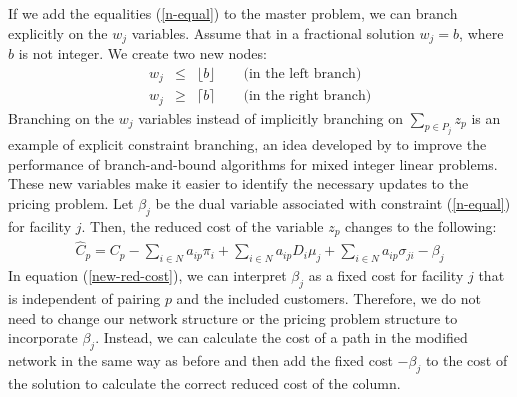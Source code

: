 \begin {itemize}
  If we add the equalities (\ref{n-equal}) to the master problem, we can branch explicitly on
  the $w_j$ variables. Assume that in a fractional solution $w_j = b$, where $b$ is not integer.
  We create two new nodes:
  \begin{eqnarray*}
    w_j & \leq & \lfloor b \rfloor \qquad  \mbox {(in the left branch)}\\
    w_j & \geq & \lceil b \rceil    \qquad \mbox {(in the right branch)}
  \end{eqnarray*} 
  Branching on the $w_j$ variables instead of implicitly  branching on $\sum_{p \in P_j}z_{p}$ 
  is an example of explicit constraint branching, an idea developed by \citet{Appleget} to 
  improve the performance of branch-and-bound algorithms for mixed integer linear problems. 
  These new variables make it easier to identify the necessary updates to the pricing problem. 
  Let $\beta_j$ be the dual variable associated with constraint (\ref{n-equal}) for facility $j$.
  Then, the reduced cost of the variable $z_{p}$  changes to the following:
  \begin{eqnarray}
    \label{new-red-cost}
    \hat{C}_{p}=C_{p}-\sum_{i\in N}a_{ip} \pi_{i}+\sum_{i \in N}a_{ip} D_{i} \mu_{j}+\sum_{i \in N}a_{ip} \sigma_{ji}-\beta_j
  \end{eqnarray} 
  In equation (\ref{new-red-cost}), we can interpret $\beta_j$ as a fixed cost for facility $j$ 
  that is independent of pairing $p$ and the included customers.  Therefore, we do not need 
  to change our network structure or the pricing problem structure to incorporate $\beta_j$. 
  Instead, we can calculate the cost of a path in the modified network in the same way as before and 
  then add the fixed cost $-\beta_j$ to the cost of the solution to calculate the correct
  reduced cost of the column.     


\end{itemize}

